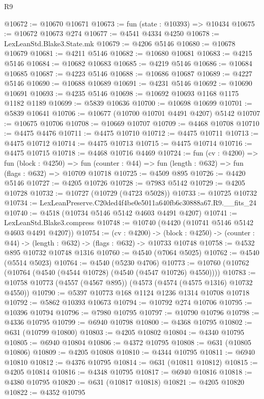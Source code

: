 \begin{lexlean}{R9}
\begin{coremodule}
@10672 := @10670 @10671
@10673 := fun (state : @10393) => @10434
@10675 := @10672 @10673 @274
@10677 := @4541 @4334 @4250
@10678 := LexLeanStd.Blake3.State.mk
@10679 := @4206 @5146
@10680 := @10678 @10679
@10681 := @4211 @5146
@10682 := @10680 @10681
@10683 := @4215 @5146
@10684 := @10682 @10683
@10685 := @4219 @5146
@10686 := @10684 @10685
@10687 := @4223 @5146
@10688 := @10686 @10687
@10689 := @4227 @5146
@10690 := @10688 @10689
@10691 := @4231 @5146
@10692 := @10690 @10691
@10693 := @4235 @5146
@10698 := @10692 @10693 @1168 @1175 @1182 @1189
@10699 := @5839 @10636
@10700 := @10698 @10699
@10701 := @5839 @10641
@10706 := @10677 (@10700 @10701 @4491 @4207) @5142
@10707 := @10675 @10706
@10708 := @10669 @10707
@10709 := @4468 @10708
@10710 := @4475 @4476
@10711 := @4475 @10710
@10712 := @4475 @10711
@10713 := @4475 @10712
@10714 := @4475 @10713
@10715 := @4475 @10714
@10716 := @4475 @10715
@10718 := @4468 @10716 @4469
@10724 := fun (cv : @4200) =>
  fun (block : @4250) =>
  fun (counter : @44) => fun (length : @632) => fun (flags : @632) => @10709 @10718
@10725 := @4509 @895
@10726 := @4420 @5146
@10727 := @4205 @10726
@10728 := @7983 @5142
@10729 := @4205 @10728
@10732 := @10727 (@10729 (@4723 @5028))
@10733 := @10725 @10732
@10734 := LexLeanPreserve.C20ded4f4be0e5011a640fb6c30888a67.R9.__fits_24
@10740 := @4518 (@10734 @5146 @5142 @4603 @4491 @4207)
@10741 := LexLeanStd.Blake3.compress
@10748 := @10740 (@4420 (@10741 @5146 @5142 @4603 @4491 @4207))
@10754 := (cv : @4200) ->
  (block : @4250) -> (counter : @44) -> (length : @632) -> (flags : @632) -> @10733 @10748
@10758 := @4532 @895 @10732 @10748 @1316
@10760 := @4540 (@7064 @5025)
@10762 := @4540 (@5514 @5023)
@10764 := @4540 (@5230 @4706)
@10773 := @10760 (@10762 (@10764 (@4540 (@4544 @10728) (@4540 (@4547 @10726) @4550))))
@10783 := @10758 @10773 (@4557 (@4567 @895)) (@4573 (@4574 (@4575 @1316) @10732 @4550))
@10790 := @5397 @10773 @168 @1124 @1236 @1314 @10708 @10718
@10792 := @5862 @10393 @10673
@10794 := @10792 @274 @10706
@10795 := @10396 @10794
@10796 := @7980 @10795
@10797 := @10790 @10796
@10798 := @4336 @10795
@10799 := @6940 @10798
@10800 := @4368 @10795
@10802 := @631 (@10799 @10800)
@10803 := @4205 @10802
@10804 := @4340 @10795
@10805 := @6940 @10804
@10806 := @4372 @10795
@10808 := @631 (@10805 @10806)
@10809 := @4205 @10808
@10810 := @4344 @10795
@10811 := @6940 @10810
@10812 := @4376 @10795
@10814 := @631 (@10811 @10812)
@10815 := @4205 @10814
@10816 := @4348 @10795
@10817 := @6940 @10816
@10818 := @4380 @10795
@10820 := @631 (@10817 @10818)
@10821 := @4205 @10820
@10822 := @4352 @10795

\end{coremodule}
\end{lexlean}
